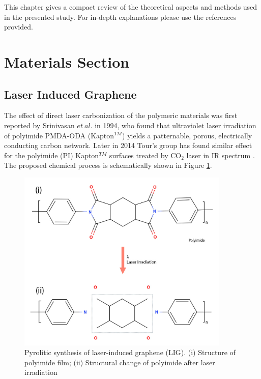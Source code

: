 This chapter gives a compact review of the theoretical aspects and methods used in the presented study. For in-depth explanations please use the references provided.

\section{Materials Section}

\subsection{Laser Induced Graphene}

The effect of direct laser carbonization of the polymeric materials was first reported by Srinivasan \textit{$et\ al.$}  \cite{Srinivasan} in 1994, who found that ultraviolet laser irradiation of  polyimide PMDA-ODA (Kapton$^{TM}$) yields a patternable, porous, electrically conducting carbon network. Later in 2014 Tour's group has found similar effect for the polyimide (PI) Kapton$^{TM}$ surfaces treated by CO$_2$ laser in IR spectrum \cite{lin_laser-induced_2014}. The proposed chemical process is schematically shown in Figure \ref{fig:PI-into-graphene}. 


\begin{figure}[H]
\centering
\includegraphics[width=0.9\textwidth]{Figures/Theory/Polyimide-into-graphene.jpg}
\medskip
\caption{Pyrolitic synthesis of laser-induced graphene (LIG). (i) Structure of polyimide ﬁlm; (ii) Structural change of polyimide after laser irradiation}
\label{fig:PI-into-graphene}
\end{figure}

